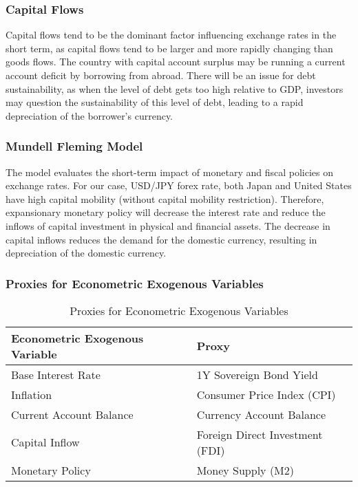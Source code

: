\documentclass{article}
\begin{document}
\subsubsection{Capital Flows}

Capital flows tend to be the dominant factor influencing exchange rates in the short term, as capital flows tend to be larger and more rapidly changing than goods flows. 
\newline
\newline
The country with capital account surplus may be running a current account deficit by borrowing from abroad. There will be an issue for debt sustainability, as when the level of debt gets too high relative to GDP, investors may question the sustainability of this level of debt, leading to a rapid depreciation of the borrower’s currency.  

\subsubsection{Mundell Fleming Model}

The model evaluates the short-term impact of monetary and fiscal policies on exchange rates.
\newline
\newline
For our case, USD/JPY forex rate, both Japan and United States have high capital mobility (without capital mobility restriction). Therefore, expansionary monetary policy will decrease the interest rate and reduce the inflows of capital investment in physical and financial assets. The decrease in capital inflows reduces the demand for the domestic currency, resulting in depreciation of the domestic currency.
\newline

\subsubsection{Proxies for Econometric Exogenous Variables}
\begin{table}[h!]
\centering
\begin{tabular}{|l|l|}
\hline
\textbf{Econometric Exogenous Variable} & \textbf{Proxy} \\
\hline
Base Interest Rate & 1Y Sovereign Bond Yield \\
\hline
Inflation & Consumer Price Index (CPI) \\
\hline
Current Account Balance & Currency Account Balance \\
\hline
Capital Inflow & Foreign Direct Investment (FDI) \\
\hline
Monetary Policy & Money Supply (M2) \\
\hline
\end{tabular}
\caption{Proxies for Econometric Exogenous Variables}
\label{table:proxies}
\end{table}
\end{document}
